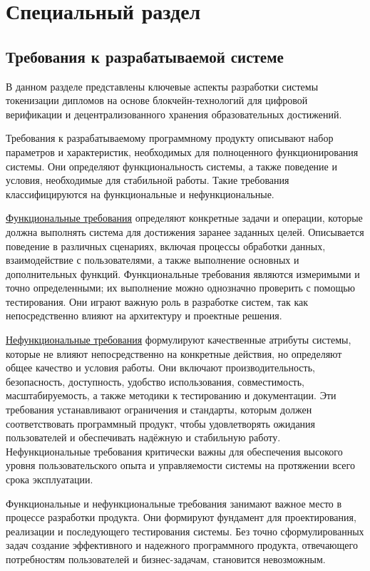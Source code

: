 \section{Специальный раздел}
\label{sec:special}

\subsection{Требования к разрабатываемой системе}

В данном разделе представлены ключевые аспекты разработки системы токенизации дипломов на основе блокчейн-технологий для цифровой верификации и децентрализованного хранения образовательных достижений. 

Требования к разрабатываемому программному продукту описывают набор параметров и характеристик, необходимых для полноценного функционирования системы. Они определяют функциональность системы, а также поведение и условия, необходимые для стабильной работы. Такие требования классифицируются на функциональные и нефункциональные.

\hyperref[subsec:func_req]{Функциональные требования} определяют конкретные задачи и операции, которые должна выполнять система для достижения заранее заданных целей. Описывается поведение в различных сценариях, включая процессы обработки данных, взаимодействие с пользователями, а также выполнение основных и дополнительных функций. Функциональные требования являются измеримыми и точно определенными; их выполнение можно однозначно проверить с помощью тестирования. Они играют важную роль в разработке систем, так как непосредственно влияют на архитектуру и проектные решения.

\hyperref[subsec:nonfunc_req]{Нефункциональные требования} формулируют качественные атрибуты системы, которые не влияют непосредственно на конкретные действия, но определяют общее качество и условия работы. Они включают производительность, безопасность, доступность, удобство использования, совместимость, масштабируемость, а также методики к тестированию и документации. Эти требования устанавливают ограничения и стандарты, которым должен соответствовать программный продукт, чтобы удовлетворять ожидания пользователей и обеспечивать надёжную и стабильную работу. Нефункциональные требования критически важны для обеспечения высокого уровня пользовательского опыта и управляемости системы на протяжении всего срока эксплуатации.

Функциональные и нефункциональные требования занимают важное место в процессе разработки продукта. Они формируют фундамент для проектирования, реализации и последующего тестирования системы. Без точно сформулированных задач создание эффективного и надежного программного продукта, отвечающего потребностям пользователей и бизнес-задачам, становится невозможным.

